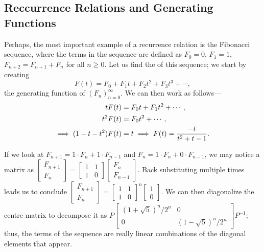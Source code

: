 \subsection{Reccurrence Relations and Generating Functions}
Perhaps, the most important example of a recurrence relation is the Fibonacci sequence, where the terms in the sequence are defined as $F_{0} = 0$, $F_{1} = 1$, $F_{n+2} = F_{n+1} + F_{n}$ for all $n \geq 0$. Let us find the  of this sequence; we start by creating
\begin{equation}
    F(t) = F_{0} + F_{1}t + F_{2}t^{2} + F_{3}t^{3} + \cdots,
\end{equation}
the generating function of $(F_{n})_{n=0}^{\infty}$. We can then work as follows---
\begin{align}
    tF(t) &= F_{0}t + F_{1}t^{2} + \cdots,\notag\\
    t^{2}F(t) &= F_{0}t^{2} + \cdots,\notag\\
    \implies (1-t-t^{2})F(t) &= t \implies F(t) = \frac{-t}{t^{2}+t-1}.
\end{align}

If we look at $F_{n+1} = 1 \cdot F_{n} + 1 \cdot F_{n-1}$ and $F_{n} = 1 \cdot F_{n} + 0 \cdot F_{n-1}$, we may notice a matrix as $\begin{bmatrix}
    F_{n+1} \\ F_{n}
\end{bmatrix} = \begin{bmatrix}
    1 & 1 \\ 1 & 0
\end{bmatrix} \begin{bmatrix}
    F_{n} \\ F_{n-1}
\end{bmatrix}$. Back substituting multiple times leads us to conclude $\begin{bmatrix}
    F_{n+1} \\ F_{n}
\end{bmatrix} = \begin{bmatrix}
    1 & 1 \\ 1 & 0
\end{bmatrix}^{n} \begin{bmatrix}
    1 \\ 0
\end{bmatrix}$. We can then diagonalize the centre matrix to decompose it as $P \begin{bmatrix}
    (1+\sqrt{5})^{n}/2^{n} & 0 \\ 0 & (1-\sqrt{5})^{n}/2^{n}
\end{bmatrix} P^{-1}$; thus, the terms of the sequence are really linear combinations of the diagonal elements that appear.